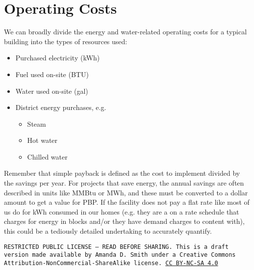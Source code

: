 \documentclass[10pt]{article}
\begin{document}
\section{Operating Costs}

We can broadly divide the energy and water-related operating costs for a typical building into the types of resources used:

\begin{itemize}
    \setlength{\itemsep}{0pt}%
    \setlength{\parskip}{0pt}%
    \item Purchased electricity (kWh)
    \item Fuel used on-site (BTU)
    \item Water used on-site (gal)
    \item District energy purchases, e.g.
    \begin{itemize}
        \item Steam
        \item Hot water
        \item Chilled water
    \end{itemize}
\end{itemize}

Remember that simple payback is defined as the cost to implement divided by the savings per year. For projects that save energy, the annual savings are often described in units like MMBtu or MWh, and these must be converted to a dollar amount to get a value for PBP. If the facility does not pay a flat rate like most of us do for kWh consumed in our homes (e.g. they are a on a rate schedule that charges for energy in blocks and/or they have demand charges to content with), this could be a tediously detailed undertaking to accurately quantify.

\bigskip

\noindent
\texttt{\footnotesize RESTRICTED PUBLIC LICENSE --- READ BEFORE SHARING. This is a draft version made available by Amanda D. Smith under a Creative Commons Attribution-NonCommercial-ShareAlike license. 
\href{https://creativecommons.org/licenses/by-nc-sa/4.0/}{CC BY-NC-SA 4.0}}

\printbibliography
\end{document}

